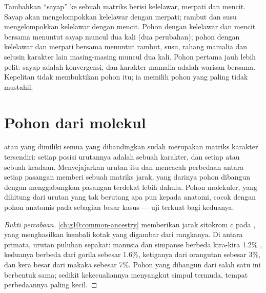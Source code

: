 \begin{example}\label{ex:g12:phylogenetic-trees:parsimony}
Tambahkan ``sayap'' ke sebuah matriks berisi kelelawar, merpati dan
mencit. Sayap akan mengelompokkan kelelawar dengan merpati; rambut dan
susu mengelompokkan kelelawar dengan mencit. Pohon dengan kelelawar
dan mencit bersama menuntut sayap muncul dua kali (dua perubahan);
pohon dengan kelelawar dan merpati bersama menuntut rambut, susu,
rahang mamalia dan selusin karakter lain masing-masing muncul dua
kali. Pohon pertama jauh lebih pelit: sayap adalah konvergensi, dan
karakter mamalia adalah warisan bersama. Kepelitan tidak membuktikan
pohon itu; ia memilih pohon yang paling tidak mustahil.
\end{example}

\section{Pohon dari molekul}

\begin{proposition}\label{prop:g12:phylogenetic-trees:molecular}
 atau  yang dimiliki semua  yang dibandingkan sudah
merupakan matriks karakter tersendiri: setiap posisi urutannya adalah
sebuah karakter, dan setiap  atau  sebuah keadaan.
Menyejajarkan urutan itu dan mencacah perbedaan antara setiap pasangan
memberi sebuah matriks jarak, yang darinya pohon dibangun dengan
menggabungkan pasangan terdekat lebih dahulu. Pohon molekuler, yang
dihitung dari urutan yang tak berutang apa pun kepada anatomi, cocok
dengan pohon anatomis pada sebagian besar kasus --- uji terkuat bagi
keduanya.
\end{proposition}
\begin{proof}[Bukti percobaan]
\cref{ch:g10:common-ancestry} memberikan jarak sitokrom c pada
, yang menghasilkan kembali kotak yang digambar dari
rangkanya. Di antara primata, urutan puluhan  sepakat: manusia dan
simpanse berbeda kira-kira 1.2\% , keduanya berbeda dari gorila
sebesar 1.6\%, ketiganya dari orangutan sebesar 3\%, dan kera besar
dari makaka sebesar 7\%. Pohon yang dibangun dari salah satu  ini
berbentuk sama; sedikit kekecualiannya menyangkut simpul termuda,
tempat perbedaannya paling kecil.
\end{proof}


